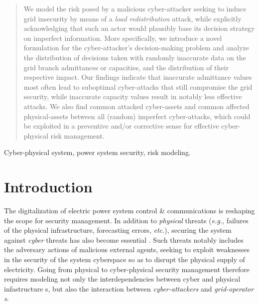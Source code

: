 \documentclass{IEEEtran4PSCC}
\begin{document}
\begin{abstract} 
We model the risk posed by a malicious cyber-attacker seeking to induce grid insecurity by means of a \emph{load redistribution} attack, while explicitly acknowledging that such an actor would plausibly base its decision strategy on imperfect information. More specifically, 
we introduce a novel formulation for the cyber-attacker's decision-making problem and analyze the distribution of decisions taken with randomly inaccurate data on the grid branch admittances or capacities, and the distribution of their respective impact. Our findings indicate that inaccurate admittance values most often lead to suboptimal cyber-attacks that still compromise the grid security, while inaccurate capacity values result in notably less effective attacks. 
We also find  common attacked cyber-assets and common affected physical-assets between all (random) imperfect cyber-attacks, which could be exploited in a preventive and/or corrective sense for effective cyber-physical risk management.
\end{abstract}

\begin{IEEEkeywords}
Cyber-physical system, power system security, risk modeling.
\end{IEEEkeywords}


\section{Introduction}

The digitalization of  electric power system control \& communications is reshaping the scope for security management. In addition to \emph{physical} threats (\textit{e.g.}, failures of the physical infrastructure, forecasting errors, \textit{etc.}), securing the system against \emph{cyber} threats has also become essential \cite{kirschen2008}. Such  {threats} notably includes the adversary actions of malicious external agents, seeking to exploit weaknesses in the security of the system cyberspace so as to disrupt the physical supply of electricity. Going from physical to cyber-physical security management therefore requires modeling not only the interdependencies between cyber and physical infastructure {s}, but also the interaction between \emph{cyber-attackers} and  \emph{grid-operator {s}}.
\end{document}
